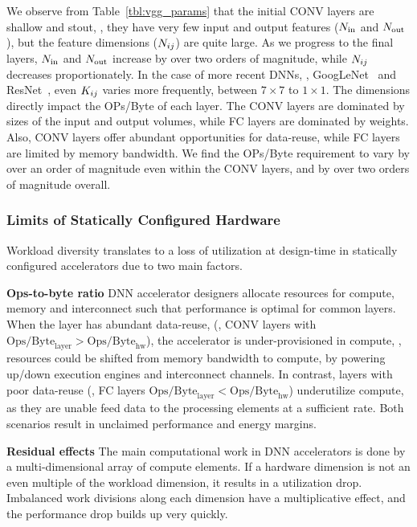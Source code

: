 We observe from Table~\ref{tbl:vgg_params} that the initial CONV layers are shallow and stout, \ie, they have very few input and output features ($N_\textrm{in}$ and $N_\textrm{out}$), but the feature dimensions ($N_{ij}$) are quite large.
As we progress to the final layers, $N_\textrm{in}$ and $N_\textrm{out}$ increase by over two orders of magnitude, while $N_{ij}$ decreases proportionately.
In the case of more recent DNNs, \eg, GoogLeNet~\cite{szegedy2015going} and ResNet~\cite{he2016deep}, even $K_{ij}$ varies more frequently, between $7\times7$ to $1\times1$.
The dimensions directly impact the OPs/Byte of each layer.
The CONV layers are dominated by sizes of the input and output volumes, while FC layers are dominated by weights.
Also, CONV layers offer abundant opportunities for data-reuse, while FC layers are limited by memory bandwidth.
We find the OPs/Byte requirement to vary by over an order of magnitude even within the CONV layers, and by over two orders of magnitude overall.

\subsubsection{Limits of Statically Configured Hardware}

Workload diversity translates to a loss of utilization at design-time in statically configured accelerators due to two main factors.

\textbf{Ops-to-byte ratio}
DNN accelerator designers allocate resources for compute, memory and interconnect such that performance is optimal for common layers.
When the layer has abundant data-reuse, (\eg, CONV layers with $\textrm{Ops}/\textrm{Byte}_\textrm{layer} > \textrm{Ops}/\textrm{Byte}_\textrm{hw}$), the accelerator is under-provisioned in compute, \ie, resources could be shifted from memory bandwidth to compute, by powering up/down execution engines and interconnect channels.
In contrast, layers with poor data-reuse (\eg, FC layers $\textrm{Ops}/\textrm{Byte}_\textrm{layer} < \textrm{Ops}/\textrm{Byte}_\textrm{hw}$) underutilize compute, as they are unable feed data to the processing elements at a sufficient rate.
Both scenarios result in unclaimed performance and energy margins.

\textbf{Residual effects} 
The main computational work in DNN accelerators is done by a multi-dimensional array of compute elements.
If a hardware dimension is not an even multiple of the workload dimension, it results in a utilization drop.
Imbalanced work divisions along each dimension have a multiplicative effect, and the performance drop builds up very quickly.

